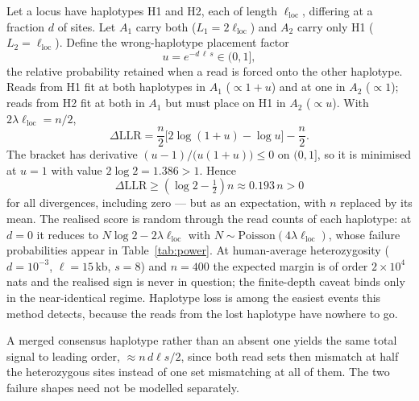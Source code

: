 \documentclass[11pt]{article}
\begin{document}
Let a locus have haplotypes H1 and H2, each of length $\ell_{\mathrm{loc}}$,
differing at a fraction $d$ of sites.  Let $A_1$ carry both
($L_1 = 2\ell_{\mathrm{loc}}$) and $A_2$ carry only H1
($L_2 = \ell_{\mathrm{loc}}$).  Define the wrong-haplotype placement factor
\begin{equation}
    u = e^{-d\,\ell\,s} \in (0,1],
\end{equation}
the relative probability retained when a read is forced onto the other
haplotype.  Reads from H1 fit at both haplotypes in $A_1$ ($\propto 1+u$) and at
one in $A_2$ ($\propto 1$); reads from H2 fit at both in $A_1$ but must place on
H1 in $A_2$ ($\propto u$).  With $2\lambda\ell_{\mathrm{loc}} = n/2$,
\begin{equation}
    \Delta\mathrm{LLR}
    = \frac{n}{2}\Big[2\log(1+u) - \log u\Big] - \frac{n}{2}.
\end{equation}
The bracket has derivative $(u-1)/\big(u(1+u)\big) \le 0$ on $(0,1]$, so it is
minimised at $u=1$ with value $2\log 2 = 1.386 > 1$.  Hence
\begin{equation}
    \Delta\mathrm{LLR} \ge \left(\log 2 - \tfrac12\right) n \approx 0.193\,n > 0
\end{equation}
for all divergences, including zero --- but as an expectation, with $n$
replaced by its mean.  The realised score is random through the read counts of
each haplotype: at $d=0$ it reduces to
$N\log 2 - 2\lambda\ell_{\mathrm{loc}}$ with
$N \sim \text{Poisson}(4\lambda\ell_{\mathrm{loc}})$, whose failure
probabilities appear in Table~\ref{tab:power}.  At human-average
heterozygosity ($d=10^{-3}$, $\ell = 15$\,kb, $s=8$) and $n=400$ the expected
margin is of order $2\times10^4$ nats and the realised sign is never in
question; the finite-depth caveat binds only in the near-identical regime.  Haplotype loss is among the easiest events this method
detects, because the reads from the lost haplotype have nowhere to go.

A merged consensus haplotype rather than an absent one yields the same total
signal to leading order, $\approx n\,d\ell s/2$, since both read sets then
mismatch at half the heterozygous sites instead of one set mismatching at all of
them.  The two failure shapes need not be modelled separately.
\end{document}
